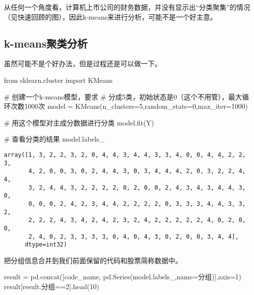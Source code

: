 \documentclass[
  letterpaper,
  DIV=11,
  numbers=noendperiod]{scrreprt}
\newenvironment{Shaded}{\begin{snugshade}}{\end{snugshade}}
\newcommand{\CommentTok}[1]{\textcolor[rgb]{0.37,0.37,0.37}{#1}}
\newcommand{\DecValTok}[1]{\textcolor[rgb]{0.68,0.00,0.00}{#1}}
\newcommand{\ImportTok}[1]{\textcolor[rgb]{0.00,0.46,0.62}{#1}}
\newcommand{\NormalTok}[1]{\textcolor[rgb]{0.00,0.23,0.31}{#1}}
\newcommand{\OperatorTok}[1]{\textcolor[rgb]{0.37,0.37,0.37}{#1}}
\newcommand{\StringTok}[1]{\textcolor[rgb]{0.13,0.47,0.30}{#1}}
\begin{document}
从任何一个角度看，计算机上市公司的财务数据，并没有显示出``分类聚集''的情况（见快速回顾的图），因此k-means来进行分析，可能不是一个好主意。

\hypertarget{k-meansux805aux7c7bux5206ux6790}{%
\subsection{k-means聚类分析}\label{k-meansux805aux7c7bux5206ux6790}}

虽然可能不是个好办法，但是过程还是可以做一下。

\begin{Shaded}
\begin{Highlighting}[]
\ImportTok{from}\NormalTok{ sklearn.cluster }\ImportTok{import}\NormalTok{ KMeans}

\CommentTok{\# 创建一个k{-}means模型，要求}
\CommentTok{\# 分成5类，初始状态是0（这个不用管），最大循环次数1000次}
\NormalTok{model }\OperatorTok{=}\NormalTok{ KMeans(n\_clusters}\OperatorTok{=}\DecValTok{5}\NormalTok{,random\_state}\OperatorTok{=}\DecValTok{0}\NormalTok{,max\_iter}\OperatorTok{=}\DecValTok{1000}\NormalTok{)}

\CommentTok{\# 用这个模型对主成分数据进行分类}
\NormalTok{model.fit(Y) }

\CommentTok{\# 查看分类的结果}
\NormalTok{model.labels\_}
\end{Highlighting}
\end{Shaded}

\begin{verbatim}
array([1, 3, 2, 2, 3, 2, 0, 4, 4, 3, 4, 4, 3, 3, 4, 0, 0, 4, 4, 2, 2, 3,
       4, 2, 0, 0, 3, 0, 2, 4, 4, 3, 0, 3, 4, 4, 4, 2, 0, 3, 2, 2, 4, 4,
       3, 2, 4, 4, 3, 2, 2, 2, 2, 0, 2, 0, 0, 2, 4, 3, 4, 3, 4, 4, 3, 0,
       0, 0, 0, 2, 4, 2, 3, 4, 4, 2, 2, 2, 2, 0, 3, 3, 3, 4, 4, 3, 3, 2,
       2, 2, 2, 4, 3, 4, 2, 4, 2, 3, 2, 4, 2, 2, 2, 2, 2, 4, 0, 2, 0, 0,
       2, 4, 0, 2, 3, 3, 3, 3, 0, 4, 0, 4, 3, 0, 2, 0, 0, 3, 4, 4],
      dtype=int32)
\end{verbatim}

把分组信息合并到我们前面保留的代码和股票简称数据中。

\begin{Shaded}
\begin{Highlighting}[]
\NormalTok{result }\OperatorTok{=}\NormalTok{ pd.concat([code\_name, pd.Series(model.labels\_,name}\OperatorTok{=}\StringTok{\textquotesingle{}分组\textquotesingle{}}\NormalTok{)],axis}\OperatorTok{=}\DecValTok{1}\NormalTok{)}
\NormalTok{result[result.分组}\OperatorTok{==}\DecValTok{2}\NormalTok{].head(}\DecValTok{10}\NormalTok{)}
\end{Highlighting}
\end{Shaded}
\end{document}
